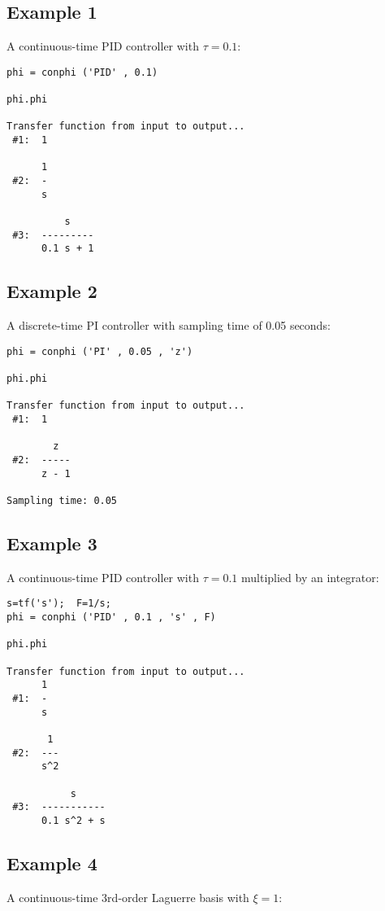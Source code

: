 \documentclass [12pt , a4paper] {report}
\begin{document}
\subsection{Example 1} A continuous-time PID controller with $\tau=0.1$:

\begin{lstlisting}
phi = conphi ('PID' , 0.1) 

phi.phi
 
Transfer function from input to output...
 #1:  1
 
      1
 #2:  -
      s
 
          s
 #3:  ---------
      0.1 s + 1      
\end{lstlisting}

\subsection{Example 2} A discrete-time PI controller with sampling time of 0.05 seconds:

\begin{lstlisting}
phi = conphi ('PI' , 0.05 , 'z') 

phi.phi
 
Transfer function from input to output...
 #1:  1
 
        z
 #2:  -----
      z - 1
 
Sampling time: 0.05
\end{lstlisting}

\subsection{Example 3} A continuous-time PID controller with $\tau=0.1$ multiplied by an integrator:

\begin{lstlisting}
s=tf('s');  F=1/s;
phi = conphi ('PID' , 0.1 , 's' , F) 

phi.phi
 
Transfer function from input to output...
      1
 #1:  -
      s
 
       1
 #2:  ---
      s^2
 
           s
 #3:  -----------
      0.1 s^2 + s    

\end{lstlisting}

\subsection{Example 4} A continuous-time 3rd-order Laguerre basis with $\xi=1$:
\end{document}
